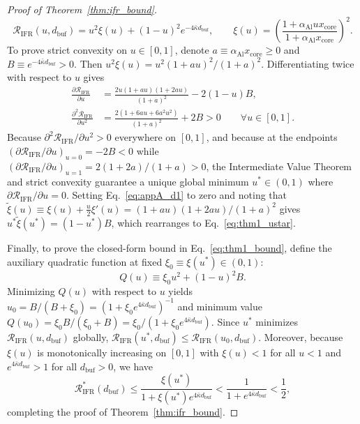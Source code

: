 \documentclass[11pt,letterpaper]{article}
\begin{document}
\begin{proof}[Proof of Theorem~\ref{thm:ifr_bound}]
\begin{equation}
\mathcal{R}_{\mathrm{IFR}}(u, d_{\mathrm{buf}}) = u^2 \xi(u) + (1 - u)^2 e^{-4\bar{\kappa} d_{\mathrm{buf}}}, \qquad \xi(u) = \left(\frac{1 + \alpha_{\mathrm{Al}} u x_{\mathrm{core}}}{1 + \alpha_{\mathrm{Al}} x_{\mathrm{core}}}\right)^2.
\label{eq:appA_ratio}
\end{equation}
To prove strict convexity on $u \in [0, 1]$, denote $a \equiv \alpha_{\mathrm{Al}} x_{\mathrm{core}} \ge 0$ and $B \equiv e^{-4\bar{\kappa} d_{\mathrm{buf}}} > 0$. Then $u^2 \xi(u) = u^2(1 + a u)^2/(1 + a)^2$. Differentiating twice with respect to $u$ gives
\begin{align}
\frac{\partial \mathcal{R}_{\mathrm{IFR}}}{\partial u} &= \frac{2 u (1 + a u)(1 + 2 a u)}{(1 + a)^2} - 2(1 - u)B, \label{eq:appA_d1}\\
\frac{\partial^2 \mathcal{R}_{\mathrm{IFR}}}{\partial u^2} &= \frac{2(1 + 6 a u + 6 a^2 u^2)}{(1 + a)^2} + 2 B > 0 \qquad \forall u \in [0, 1]. \label{eq:appA_d2}
\end{align}
Because $\partial^2 \mathcal{R}_{\mathrm{IFR}}/\partial u^2 > 0$ everywhere on $[0, 1]$, and because at the endpoints $(\partial \mathcal{R}_{\mathrm{IFR}}/\partial u)_{u=0} = -2B < 0$ while $(\partial \mathcal{R}_{\mathrm{IFR}}/\partial u)_{u=1} = 2(1+2a)/(1+a) > 0$, the Intermediate Value Theorem and strict convexity guarantee a unique global minimum $u^* \in (0, 1)$ where $\partial \mathcal{R}_{\mathrm{IFR}}/\partial u = 0$. Setting Eq.~\eqref{eq:appA_d1} to zero and noting that $\tilde{\xi}(u) \equiv \xi(u) + \frac{u}{2}\xi'(u) = (1+au)(1+2au)/(1+a)^2$ gives $u^* \tilde{\xi}(u^*) = (1 - u^*)B$, which rearranges to Eq.~\eqref{eq:thm1_ustar}.

Finally, to prove the closed-form bound in Eq.~\eqref{eq:thm1_bound}, define the auxiliary quadratic function at fixed $\xi_0 \equiv \xi(u^*) \in (0, 1)$:
\begin{equation}
Q(u) \equiv \xi_0 u^2 + (1 - u)^2 B.
\label{eq:appA_quad}
\end{equation}
Minimizing $Q(u)$ with respect to $u$ yields $u_0 = B/(B + \xi_0) = (1 + \xi_0 e^{4\bar{\kappa} d_{\mathrm{buf}}})^{-1}$ and minimum value $Q(u_0) = \xi_0 B / (\xi_0 + B) = \xi_0 / (1 + \xi_0 e^{4\bar{\kappa} d_{\mathrm{buf}}})$. Since $u^*$ minimizes $\mathcal{R}_{\mathrm{IFR}}(u, d_{\mathrm{buf}})$ globally, $\mathcal{R}_{\mathrm{IFR}}(u^*, d_{\mathrm{buf}}) \le \mathcal{R}_{\mathrm{IFR}}(u_0, d_{\mathrm{buf}})$. Moreover, because $\xi(u)$ is monotonically increasing on $[0,1]$ with $\xi(u) < 1$ for all $u < 1$ and $e^{4\bar{\kappa} d_{\mathrm{buf}}} > 1$ for all $d_{\mathrm{buf}} > 0$, we have
\begin{equation}
\mathcal{R}_{\mathrm{IFR}}^*(d_{\mathrm{buf}}) \le \frac{\xi(u^*)}{1 + \xi(u^*) e^{4\bar{\kappa} d_{\mathrm{buf}}}} < \frac{1}{1 + e^{4\bar{\kappa} d_{\mathrm{buf}}}} < \frac{1}{2},
\label{eq:appA_final_ineq}
\end{equation}
completing the proof of Theorem~\ref{thm:ifr_bound}.
\end{proof}
\end{document}
